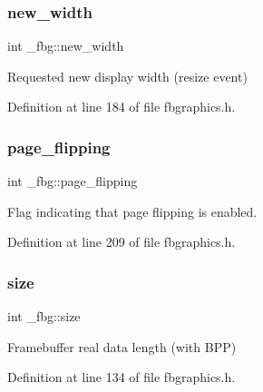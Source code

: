 \mbox{\label{struct__fbg_a95859bd418a5cfff155cdb1421d295ef}} 
\subsubsection{\texorpdfstring{new\+\_\+width}{new\_width}}
{\footnotesize\ttfamily int \+\_\+fbg\+::new\+\_\+width}



Requested new display width (resize event) 



Definition at line 184 of file fbgraphics.\+h.

\mbox{\label{struct__fbg_ad32509bca6ac4fb467476834cb8ce9d2}} 
\subsubsection{\texorpdfstring{page\+\_\+flipping}{page\_flipping}}
{\footnotesize\ttfamily int \+\_\+fbg\+::page\+\_\+flipping}



Flag indicating that page flipping is enabled. 



Definition at line 209 of file fbgraphics.\+h.

\mbox{\label{struct__fbg_a84fb220d4804cba22176997898e75b73}} 
\subsubsection{\texorpdfstring{size}{size}}
{\footnotesize\ttfamily int \+\_\+fbg\+::size}



Framebuffer real data length (with B\+PP) 



Definition at line 134 of file fbgraphics.\+h.

\mbox{\label{struct__fbg_a0463af9bf583afe770b822c1fbb9a24d}} 
